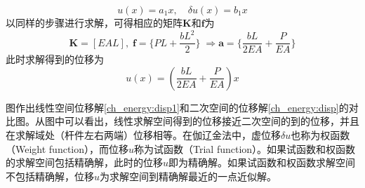 \begin{equation}
u(x) = a_1 x, \quad \delta u(x) = b_1 x
\end{equation}
以同样的步骤进行求解，可得相应的矩阵$\boldsymbol K$和$\boldsymbol f$为
\begin{equation}
    \boldsymbol K = [EAL], \; \boldsymbol f = \{PL+\frac{bL^2}{2}\}\;\Rightarrow \boldsymbol a = \{\frac{bL}{2EA} + \frac{P}{EA}\}
\end{equation}
此时求解得到的位移为
\begin{equation}\label{ch_energy:disp1}
u(x) = (\frac{bL}{2EA} + \frac{P}{EA})x
\end{equation}\par
图作出线性空间位移解\eqref{ch_energy:disp1}和二次空间的位移解\eqref{ch_energy:disp}的对比图。从图中可以看出，线性求解空间得到的位移接近二次空间的到的位移，并且在求解域处（杆件左右两端）位移相等。在伽辽金法中，虚位移$\delta u$也称为权函数（Weight function），而位移$u$称为试函数（Trial function）。如果试函数和权函数的求解空间包括精确解，此时的位移$u$即为精确解。如果试函数和权函数求解空间不包括精确解，位移$u$为求解空间到精确解最近的一点近似解。

